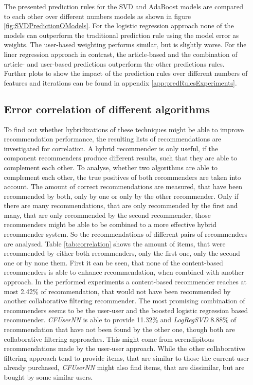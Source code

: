 \documentclass[10pt]{reportMaster}
\begin{document}
The presented prediction rules for the SVD and AdaBoost models are compared to each other over different numbers models as shown in figure \ref{fig:SVDPredictionOModels}. %
For the logistic regression approach none of the models can outperform the traditional prediction rule using the model error as weights.
The user-based weighting performs similar, but is slightly worse.
For the liner regression approach in contrast, the article-based and the combination of article- and user-based predictions outperform the other predictions rules.
Further plots to show the impact of the prediction rules over different numbers of features and iterations can be found in appendix \ref{app:predRulesExperiments}.

\FloatBarrier


\subsection*{Error correlation of different algorithms}
To find out whether hybridizations of these techniques might be able to improve recommendation performance, the resulting lists of recommendations are investigated for correlation.
A hybrid recommender is only useful, if the component recommenders produce different results, such that they are able to complement each other.
To analyse, whether two algorithms are able to complement each other, the true positives of both recommenders are taken into account.
The amount of correct recommendations are measured, that have been recommended by both, only by one or only by the other recommender.
Only if there are many recommendations, that are only recommended by the first and many, that are only recommended by the second recommender, those recommenders might be able to be combined to a more effective hybrid recommender system.
So the recommendations of different pairs of recommenders are analysed.
Table \ref{tab:correlation} shows the amount of items, that were recommended by either both recommenders, only the first one, only the second one or by none them.
First it can be seen, that none of the content-based recommenders is able to enhance recommendation, when combined with another approach.
In the performed experiments a content-based recommender reaches at most 2.42\% of recommendation, that would not have been recommended by another collaborative filtering recommender.
The most promising combination of recommenders seems to be the user-user and the boosted logistic regression based recommender.
\textit{CFUserNN} is able to provide 11.32\% and \textit{LogRegSVD} 8.88\% of recommendation that have not been found by the other one, though both are collaborative filtering approaches.
This might come from serendipitous recommendations made by the user-user approach.
While the other collaborative filtering approach tend to provide items, that are similar to those the current user already purchased, \textit{CFUserNN} might also find items, that are dissimilar, but are bought by some similar users.
\end{document}
